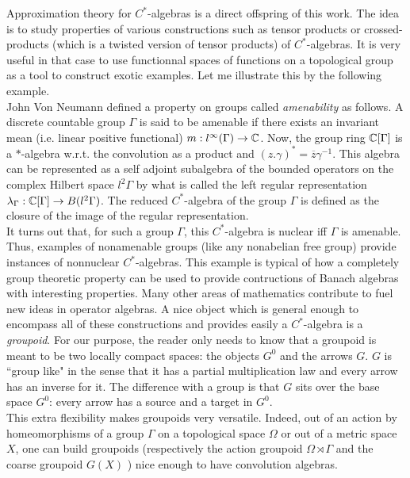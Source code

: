 Approximation theory for $C^*$-algebras is a direct offspring of this work. The idea is to study properties of various constructions such as tensor products or crossed-products (which is a twisted version of tensor products) of $C^*$-algebras. It is very useful in that case to use functionnal spaces of functions on a topological group as a tool to construct exotic examples. Let me illustrate this by the following example.\\

John Von Neumann defined a property on groups called \textit{amenability} as follows. A discrete countable group $\Gamma$ is said to be amenable if there exists an invariant mean (i.e. linear positive functional) $m: l^\infty(\Gamma)\rightarrow \mathbb{C}$. Now, the group ring $\mathbb{C}[\Gamma]$ is a $*$-algebra w.r.t. the convolution as a product and $(z. \gamma)^* = \overline{z}\gamma^{-1}$. This algebra can be represented as a self adjoint subalgebra of the bounded operators on the complex Hilbert space $l^2\Gamma$ by what is called the left regular representation $\lambda_\Gamma: \mathbb{C}[\Gamma]\rightarrow B(l^2\Gamma)$. The reduced $C^*$-algebra of the group $\Gamma$ is defined as the closure of the image of the regular representation.\\

It turns out that, for such a group $\Gamma$, this $C^*$-algebra is nuclear iff $\Gamma$ is amenable. Thus, examples of nonamenable groups (like any nonabelian free group) provide instances of nonnuclear $C^*$-algebras. This example is typical of how a completely group theoretic property can be used to provide contructions of Banach algebras with interesting properties. Many other areas of mathematics contribute to fuel new ideas in operator algebras. A nice object which is general enough to encompass all of these constructions and provides easily a $C^*$-algebra is a \textit{groupoid}. For our purpose, the reader only needs to know that a groupoid is meant to be two locally compact spaces: the objects $G^0$ and the arrows $G$. $G$ is ``group like" in the sense that it has a partial multiplication law and every arrow has an inverse for it. The difference with a group is that $G$ sits over the base space $G^0$: every arrow has a source and a target in $G^0$.\\  

This extra flexibility makes groupoids very versatile. Indeed, out of an action by homeomorphisms of a group $\Gamma$ on a topological space $\Omega$ or out of a metric space $X$, one can build groupoids (respectively the action groupoid $\Omega \rtimes \Gamma$ and the coarse groupoid $G(X)$ \cite{SkTuYu}) nice enough to have convolution algebras. \\  

